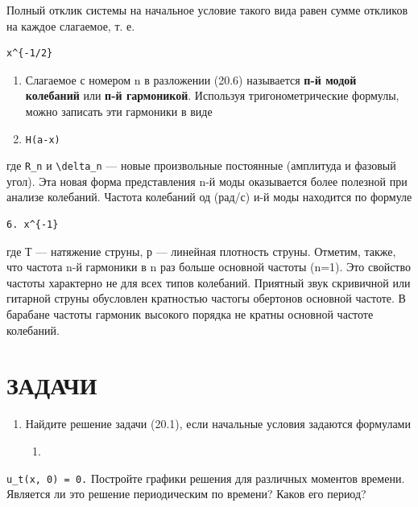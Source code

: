 \documentclass[
  ukrainian,
]{article}
\begin{document}
Полный отклик системы на начальное условие такого вида равен сумме
откликов на каждое слагаемое, т. е.

\begin{verbatim}
x^{-1/2}
\end{verbatim}

\begin{enumerate}
\def\labelenumi{\arabic{enumi}.}
\setcounter{enumi}{1}
\item
  Слагаемое с номером n в разложении (20.6) называется \textbf{п-й модой
  колебаний} или \textbf{п-й гармоникой}. Используя тригонометрические
  формулы, можно записать эти гармоники в виде
\item
  \texttt{H(a-x)}
\end{enumerate}

где \texttt{R\_n} и \texttt{\textbackslash{}delta\_n} --- новые
произвольные постоянные (амплитуда и фазовый угол). Эта новая форма
представления n-й моды оказывается более полезной при анализе колебаний.
Частота колебаний од (рад/с) и-й моды находится по формуле

\begin{verbatim}
6. x^{-1}
\end{verbatim}

где Т --- натяжение струны, р --- линейная плотность струны. Отметим,
также, что частота n-й гармоники в n раз больше основной частоты (n=1).
Это свойство частоты характерно не для всех типов колебаний. Приятный
звук скривичной или гитарной струны обусловлен кратностью частогы
обертонов основной частоте. В барабане частоты гармоник высокого порядка
не кратны основной частоте колебаний.

\section{ЗАДАЧИ}\label{ux437ux430ux434ux430ux447ux438}

\begin{enumerate}
\def\labelenumi{\arabic{enumi}.}
\item
  Найдите решение задачи (20.1), если начальные условия задаются
  формулами

  \begin{enumerate}
  \def\labelenumii{\arabic{enumii}.}
  \setcounter{enumii}{6}
  \item
  \end{enumerate}
\end{enumerate}

\texttt{u\_t(x,\ 0)\ =\ 0.} Постройте графики решения для различных
моментов времени. Является ли это решение периодическим по времени?
Каков его период?
\end{document}
